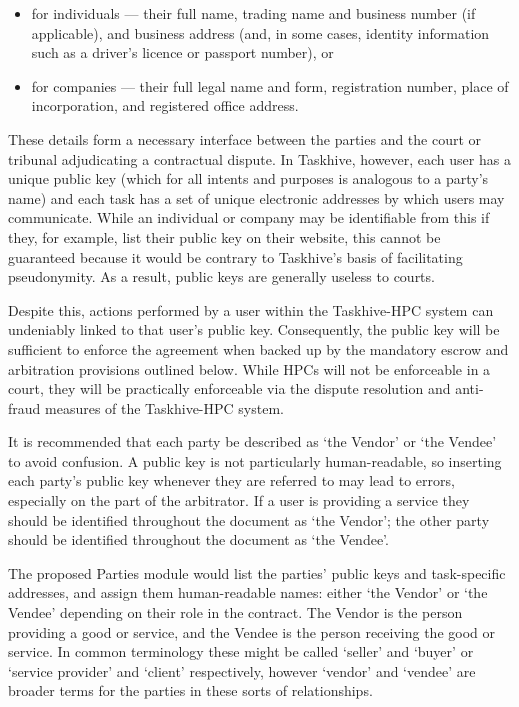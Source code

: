 \documentclass[a4paper,12pt]{article}
\begin{document}
\begin{itemize}
	\item for individuals --- their full name, trading name and business number (if applicable), and business address (and, in some cases, identity information such as a driver's licence or passport number), or
	\item for companies --- their full legal name and form, registration number, place of incorporation, and registered office address.
\end{itemize}

These details form a necessary interface between the parties and the court or tribunal adjudicating a contractual dispute. In Taskhive, however, each user has a unique public key (which for all intents and purposes is analogous to a party's name) and each task has a set of unique electronic addresses by which users may communicate. While an individual or company may be identifiable from this if they, for example, list their public key on their website, this cannot be guaranteed because it would be contrary to Taskhive's basis of facilitating pseudonymity. As a result, public keys are generally useless to courts.

Despite this, actions performed by a user within the Taskhive-HPC system can undeniably linked to that user's public key. Consequently, the public key will be sufficient to enforce the agreement when backed up by the mandatory escrow and arbitration provisions outlined below. While HPCs will not be enforceable in a court, they will be practically enforceable via the dispute resolution and anti-fraud measures of the Taskhive-HPC system.

It is recommended that each party be described as `the Vendor' or `the Vendee' to avoid confusion. A public key is not particularly human-readable, so inserting each party's public key whenever they are referred to may lead to errors, especially on the part of the arbitrator. If a user is providing a service they should be identified throughout the document as `the Vendor'; the other party should be identified throughout the document as `the Vendee'.

The proposed Parties module would list the parties' public keys and task-specific addresses, and assign them human-readable names: either `the Vendor' or `the Vendee' depending on their role in the contract. The Vendor is the person providing a good or service, and the Vendee is the person receiving the good or service. In common terminology these might be called `seller' and `buyer' or `service provider' and `client' respectively, however `vendor' and `vendee' are broader terms for the parties in these sorts of relationships.
\end{document}
